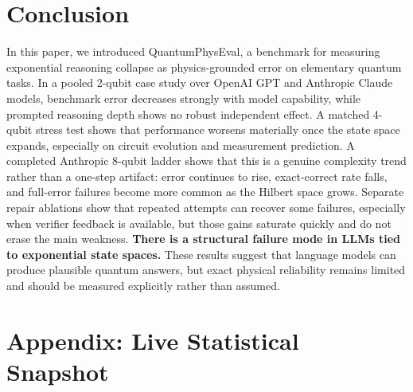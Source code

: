 \documentclass[11pt]{article}
\newcommand{\appendixsnapshot}{%
{\small
\setlength{\tabcolsep}{6pt}
\renewcommand{\arraystretch}{1.08}
\sloppy

}%
}
\begin{document}
\section{Conclusion}
In this paper, we introduced QuantumPhysEval, a benchmark for measuring exponential reasoning collapse as physics-grounded error on elementary quantum tasks. In a pooled 2-qubit case study over OpenAI GPT and Anthropic Claude models, benchmark error decreases strongly with model capability, while prompted reasoning depth shows no robust independent effect. A matched 4-qubit stress test shows that performance worsens materially once the state space expands, especially on circuit evolution and measurement prediction. A completed Anthropic 8-qubit ladder shows that this is a genuine complexity trend rather than a one-step artifact: error continues to rise, exact-correct rate falls, and full-error failures become more common as the Hilbert space grows. Separate repair ablations show that repeated attempts can recover some failures, especially when verifier feedback is available, but those gains saturate quickly and do not erase the main weakness. \textbf{There is a structural failure mode in LLMs tied to exponential state spaces.} These results suggest that language models can produce plausible quantum answers, but exact physical reliability remains limited and should be measured explicitly rather than assumed.

\appendix
\section*{Appendix: Live Statistical Snapshot}
\appendixsnapshot
\end{document}

